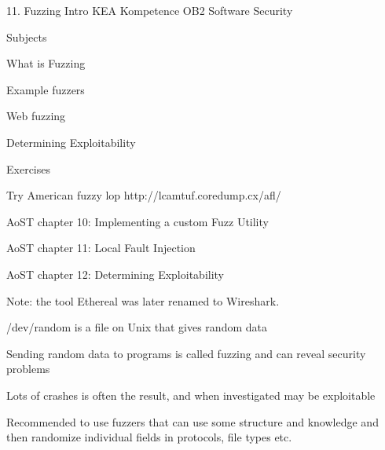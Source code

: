 \documentclass[Screen16to9,17pt]{foils}
\begin{document}
\mytitlepage
{11. Fuzzing Intro}
{KEA Kompetence OB2 Software Security}


\begin{list1}
\item Subjects
\begin{list2}
\item What is Fuzzing
\item Example fuzzers
\item Web fuzzing
\item Determining Exploitability
\end{list2}
\item Exercises
\begin{list2}
\item Try American fuzzy lop http://lcamtuf.coredump.cx/afl/
\end{list2}
\end{list1}


\begin{list1}
\item AoST chapter 10: Implementing a custom Fuzz Utility
\item AoST chapter 11: Local Fault Injection
\item AoST chapter 12: Determining Exploitability
\end{list1}

Note: the tool Ethereal was later renamed to Wireshark.



\begin{list1}
\item /dev/random is a file on Unix that gives random data
\item Sending random data to programs is called fuzzing and can reveal security problems
\item Lots of crashes is often the result, and when investigated may be exploitable
\item Recommended to use fuzzers that can use some structure and knowledge and then randomize individual fields in protocols, file types etc.
\end{list1}

\end{document}
